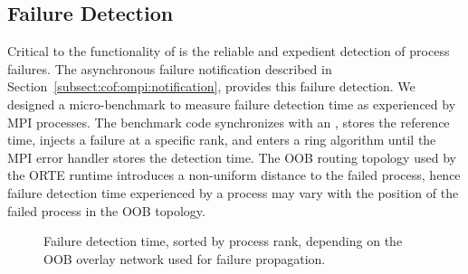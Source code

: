 \subsection{Failure Detection}\label{subsect:cof:performance:detection}

Critical to the functionality of \cof is the reliable and expedient detection of
process failures. The asynchronous failure notification described in
Section~\ref{subsect:cof:ompi:notification}, provides this failure detection. We
designed a micro-benchmark to measure failure detection time as experienced by
MPI processes. The benchmark code synchronizes with an ,
stores the reference time, injects a failure at a specific rank, and enters a
ring algorithm until the MPI error handler stores the detection time. The OOB
routing topology used by the ORTE runtime introduces a non-uniform distance to
the failed process, hence failure detection time experienced by a process may
vary with the position of the failed process in the OOB topology.

\begin{figure}[t]
    \centering 
	\hfill
    \caption{Failure detection time, sorted by process rank, depending on the OOB 
    overlay network used for failure propagation.}
    \label{fig:cof:detection}
\end{figure}

